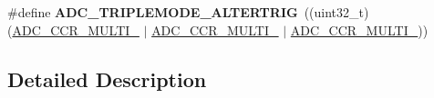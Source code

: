 \begin{DoxyCompactItemize}
\item 
\#define {\bfseries A\+D\+C\+\_\+\+T\+R\+I\+P\+L\+E\+M\+O\+D\+E\+\_\+\+A\+L\+T\+E\+R\+T\+R\+IG}~((uint32\+\_\+t)(\hyperlink{group___peripheral___registers___bits___definition_ga5087b3cb0d4570b80b3138c277bcbf6c}{A\+D\+C\+\_\+\+C\+C\+R\+\_\+\+M\+U\+L\+T\+I\+\_} $\vert$ \hyperlink{group___peripheral___registers___bits___definition_gae55be7b911b4c0272543f98a0dba5f20}{A\+D\+C\+\_\+\+C\+C\+R\+\_\+\+M\+U\+L\+T\+I\+\_} $\vert$ \hyperlink{group___peripheral___registers___bits___definition_gae4e7104ce01e3a79b8f6138d87dc3684}{A\+D\+C\+\_\+\+C\+C\+R\+\_\+\+M\+U\+L\+T\+I\+\_}))\hypertarget{group___a_d_c_ex___common__mode_ga5ad65e0e5b27f2f72d4856b3651f0b8b}{}\label{group___a_d_c_ex___common__mode_ga5ad65e0e5b27f2f72d4856b3651f0b8b}

\end{DoxyCompactItemize}


\subsection{Detailed Description}
